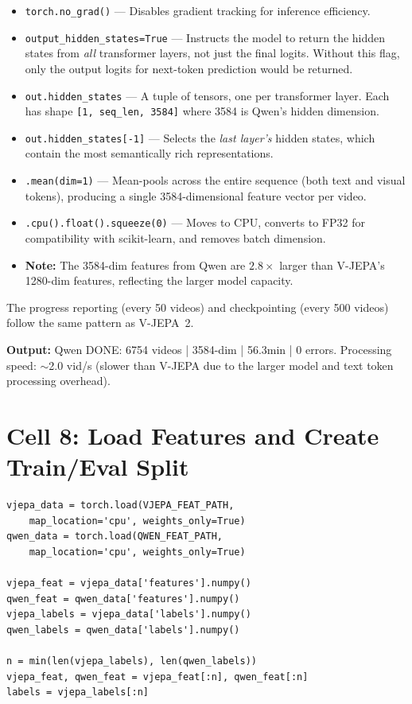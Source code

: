 \begin{explanation}
\begin{itemize}[nosep]
  \item \texttt{torch.no\_grad()} --- Disables gradient tracking for inference efficiency.
  \item \texttt{output\_hidden\_states=True} --- Instructs the model to return the hidden states from \textit{all} transformer layers, not just the final logits. Without this flag, only the output logits for next-token prediction would be returned.
  \item \texttt{out.hidden\_states} --- A tuple of tensors, one per transformer layer. Each has shape \texttt{[1, seq\_len, 3584]} where 3584 is Qwen's hidden dimension.
  \item \texttt{out.hidden\_states[-1]} --- Selects the \textit{last layer's} hidden states, which contain the most semantically rich representations.
  \item \texttt{.mean(dim=1)} --- Mean-pools across the entire sequence (both text and visual tokens), producing a single 3584-dimensional feature vector per video.
  \item \texttt{.cpu().float().squeeze(0)} --- Moves to CPU, converts to FP32 for compatibility with scikit-learn, and removes batch dimension.
  \item \textbf{Note:} The 3584-dim features from Qwen are $2.8\times$ larger than V-JEPA's 1280-dim features, reflecting the larger model capacity.
\end{itemize}
\end{explanation}

The progress reporting (every 50 videos) and checkpointing (every 500 videos) follow the same pattern as V-JEPA~2.

\textbf{Output:} Qwen DONE: 6754 videos | 3584-dim | 56.3min | 0 errors. Processing speed: $\sim$2.0 vid/s (slower than V-JEPA due to the larger model and text token processing overhead).

\newpage
\section{Cell 8: Load Features and Create Train/Eval Split}

\begin{lstlisting}
vjepa_data = torch.load(VJEPA_FEAT_PATH,
    map_location='cpu', weights_only=True)
qwen_data = torch.load(QWEN_FEAT_PATH,
    map_location='cpu', weights_only=True)

vjepa_feat = vjepa_data['features'].numpy()
qwen_feat = qwen_data['features'].numpy()
vjepa_labels = vjepa_data['labels'].numpy()
qwen_labels = qwen_data['labels'].numpy()

n = min(len(vjepa_labels), len(qwen_labels))
vjepa_feat, qwen_feat = vjepa_feat[:n], qwen_feat[:n]
labels = vjepa_labels[:n]
\end{lstlisting}

